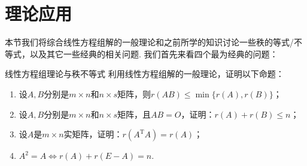 \section{理论应用}

本节我们将综合线性方程组解的一般理论和之前所学的知识讨论一些秩的等式/不等式，以及其它一些经典的相关问题. 我们首先来看四个最为经典的问题：
\begin{example}{}{线性方程组理论与秩不等式}
    利用线性方程组解的一般理论，证明以下命题：
    \begin{enumerate}
        \item  设$A,B$分别是$m \times n$和$n \times s$矩阵，则$r(AB)\leqslant\min\{r(A),r(B)\}$；

        \item 设$A,B$分别是$m \times n$和$n \times s$矩阵，且$AB=O$，证明：$r(A)+r(B)\leqslant n$；

        \item 设$A$是$m \times n$实矩阵，证明：$r(A^\mathrm{T}A)=r(A)$；

        \item $A^2=A \iff r(A)+r(E-A)=n$.
    \end{enumerate}
\end{example}

